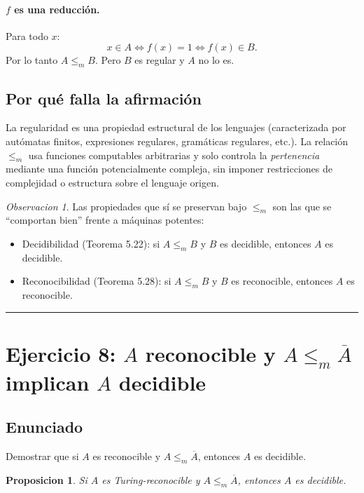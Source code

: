 \documentclass[11pt,a4paper]{article}
\theoremstyle{plain}
\newtheorem{proposicion}[teorema]{Proposicion}
\theoremstyle{definition}
\theoremstyle{remark}
\newtheorem*{observacion}{Observacion}
\newcommand{\redm}{\le_{m}}
\newcommand{\compl}[1]{\overline{#1}}
\begin{document}
\paragraph{$f$ es una reducci\'on.} Para todo $x$:
\[
  x\in A \iff f(x)=1 \iff f(x)\in B.
\]
Por lo tanto $A\redm B$. Pero $B$ es regular y $A$ no lo es.

\subsection*{Por qu\'e falla la afirmaci\'on}

La regularidad es una propiedad estructural de los lenguajes (caracterizada
por aut\'omatas finitos, expresiones regulares, gram\'aticas regulares,
etc.). La relaci\'on $\redm$ usa funciones computables arbitrarias y solo
controla la \emph{pertenencia} mediante una funci\'on potencialmente
compleja, sin imponer restricciones de complejidad o estructura sobre el
lenguaje origen.

\begin{observacion}
Las propiedades que s\'i se preservan bajo $\redm$ son las que se
``comportan bien'' frente a m\'aquinas potentes:
\begin{itemize}
  \item Decidibilidad (Teorema 5.22): si $A\redm B$ y $B$ es decidible,
        entonces $A$ es decidible.
  \item Reconocibilidad (Teorema 5.28): si $A\redm B$ y $B$ es reconocible,
        entonces $A$ es reconocible.
\end{itemize}
\end{observacion}

\bigskip\hrule\bigskip

\section{Ejercicio 8: $A$ reconocible y $A\redm \compl{A}$ implican $A$ decidible}
\label{sec:ej8}

\subsection*{Enunciado}

Demostrar que si $A$ es reconocible y $A\redm \compl{A}$, entonces $A$
es decidible.

\begin{proposicion}
\label{prop:ej8}
Si $A$ es Turing-reconocible y $A\redm \compl{A}$, entonces $A$ es
decidible.
\end{proposicion}
\end{document}
